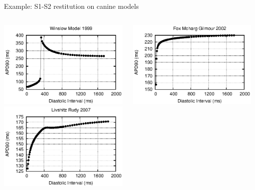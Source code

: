 \documentclass[t,xcolor={usenames,dvipsnames}]{beamer}
\begin{document}
\begin{frame}{Example: S1-S2 restitution on canine models}
\begin{columns}[T]
\begin{column}{.33\linewidth}
\begin{center}
\includegraphics[width=\textwidth]{winslow_model_1999_s1s2_curve}\\
\vspace{.1cm}
\includegraphics[width=\textwidth]{livshitz_rudy_2007_s1s2_curve}
\end{center}
\end{column}
\begin{column}{.33\linewidth}
\begin{center}
\includegraphics[width=\textwidth]{fox_mcharg_gilmour_2002_s1s2_curve}\\

\end{center}
\end{column}
\end{columns}
\end{frame}
\end{document}
